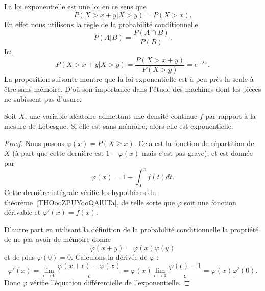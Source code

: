 La loi exponentielle est une loi  en ce sens que
\begin{equation}
	P(X>x+y|X>y)=P(X>x).
\end{equation}
En effet nous utilisons la règle de la probabilité conditionnelle
\begin{equation}
	P(A|B)=\frac{ P(A\cap B) }{ P(B) }.
\end{equation}
Ici,
\begin{equation}
	P(X>x+y|X>y)=\frac{ P(X>x+y) }{ P(X>y) }= e^{-\lambda x}.
\end{equation}
La proposition suivante montre que la loi exponentielle est à peu près la seule à être sans mémoire. D'où son importance dans l'étude des machines dont les pièces ne subissent pas d'usure.

\begin{proposition} \label{PropREXaIBg}
	Soit \( X\), une variable aléatoire admettant une densité continue \( f\) par rapport à la mesure de Lebesgue. Si elle est sans mémoire, alors elle est exponentielle.
\end{proposition}

\begin{proof}
	Nous posons \( \varphi(x)=P(X\geq x)\). Cela est la fonction de répartition de \( X\) (à part que cette dernière est \( 1-\varphi(x)\) mais c'est pas grave), et est donnée par
	\begin{equation}
		\varphi(x)=1-\int_0^xf(t)dt.
	\end{equation}
	Cette dernière intégrale vérifie les hypothèses du théorème~\ref{THOooZPUYooQAlUTa}, de telle sorte que \( \varphi\) soit une fonction dérivable et \( \varphi'(x)=f(x)\).

	D'autre part en utilisant la définition de la probabilité conditionnelle la propriété de ne pas avoir de mémoire donne
	\begin{equation}
		\varphi(x+y)=\varphi(x)\varphi(y)
	\end{equation}
	et de plus \( \varphi(0)=0\). Calculons la dérivée de \( \varphi\) :
	\begin{equation}
		\varphi'(x)=\lim_{\epsilon\to 0}\frac{ \varphi(x+\epsilon)-\varphi(x) }{ \epsilon }=\varphi(x)\lim_{\epsilon\to 0}\frac{ \varphi(\epsilon)-1 }{ \epsilon }=\varphi(x)\varphi'(0).
	\end{equation}
	Donc \( \varphi\) vérifie l'équation différentielle de l'exponentielle.

\end{proof}

